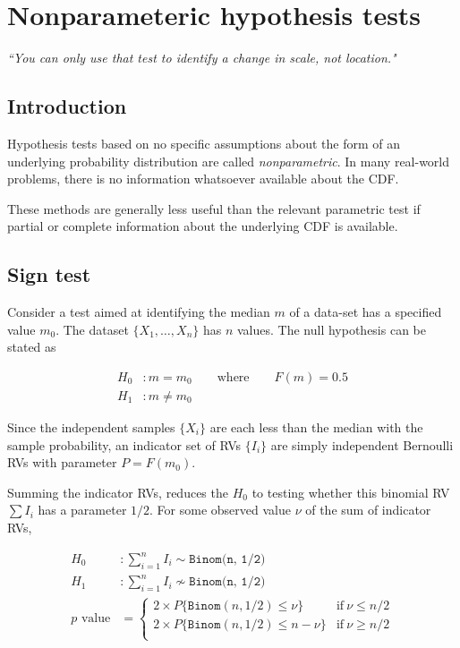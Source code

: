 \chapter{Nonparameteric hypothesis tests}


\begin{flushright}
	\textit{``You can only use that test to identify a change in scale, not location."} 
\end{flushright}

\section{Introduction}

Hypothesis tests based on no specific assumptions about the form of an underlying probability distribution are called \textit{nonparametric}. In many real-world problems, there is no information whatsoever available about the CDF.

These methods are generally less useful than the relevant parametric test if partial or complete information about the underlying CDF is available.

\section{Sign test}

Consider a test aimed at identifying the median $ m $ of a data-set has a specified value $ m_0 $. The dataset $ \{X_1, \dots, X_n\} $ has $ n $ values. The null hypothesis can be stated as

\begin{align}
	H_0 &: m = m_0 \qquad \text{where} \qquad F(m) = 0.5 \\
	H_1 &: m \neq m_0 \nonumber
\end{align}

Since the independent samples $ \{X_i\} $ are each less than the median with the sample probability, an indicator set of RVs $ \{I_i\} $ are simply independent Bernoulli RVs with parameter $ P = F(m_0) $.

Summing the indicator RVs, reduces the $ H_0 $ to testing whether this binomial RV $ \sum I_i $ has a parameter $ 1/2 $. For some observed value $ \nu $ of the sum of indicator RVs, 

\begin{align}
	H_0 &: \sum\limits_{i = 1}^{n} I_i \sim \texttt{Binom(n, 1/2)} \\
	H_1 &: \sum\limits_{i = 1}^{n} I_i \nsim \texttt{Binom(n, 1/2)} \nonumber \\
	p\text{ value} &= 
	\begin{cases}
		2 \times P\{\texttt{Binom}(n, 1/2) \leq \nu\} & \text{if}\ \nu \leq n/2 \\
		2 \times P\{\texttt{Binom}(n, 1/2) \leq n - \nu\} & \text{if}\ \nu \geq n/2 \\
	\end{cases}
\end{align}


